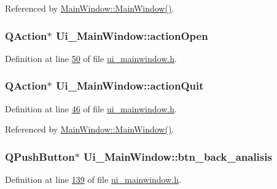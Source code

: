Referenced by \hyperlink{a00109_source_l00024}{Main\+Window\+::\+Main\+Window()}.

\hypertarget{a00080_a5772f39001f62b7f601aafe72caa10c0}{
\subsubsection[{action\+Open}]{\setlength{\rightskip}{0pt plus 5cm}Q\+Action$\ast$ Ui\+\_\+\+Main\+Window\+::action\+Open}}\label{a00080_a5772f39001f62b7f601aafe72caa10c0}


Definition at line \hyperlink{a00139_source_l00050}{50} of file \hyperlink{a00139_source}{ui\+\_\+mainwindow.\+h}.

\hypertarget{a00080_a188c243f36a2dbc10e4e2a0ad94273b1}{
\subsubsection[{action\+Quit}]{\setlength{\rightskip}{0pt plus 5cm}Q\+Action$\ast$ Ui\+\_\+\+Main\+Window\+::action\+Quit}}\label{a00080_a188c243f36a2dbc10e4e2a0ad94273b1}


Definition at line \hyperlink{a00139_source_l00046}{46} of file \hyperlink{a00139_source}{ui\+\_\+mainwindow.\+h}.



Referenced by \hyperlink{a00109_source_l00024}{Main\+Window\+::\+Main\+Window()}.

\hypertarget{a00080_a5704296b847187d5975858d04c8c2513}{
\subsubsection[{btn\+\_\+back\+\_\+analisis}]{\setlength{\rightskip}{0pt plus 5cm}Q\+Push\+Button$\ast$ Ui\+\_\+\+Main\+Window\+::btn\+\_\+back\+\_\+analisis}}\label{a00080_a5704296b847187d5975858d04c8c2513}


Definition at line \hyperlink{a00139_source_l00139}{139} of file \hyperlink{a00139_source}{ui\+\_\+mainwindow.\+h}.

